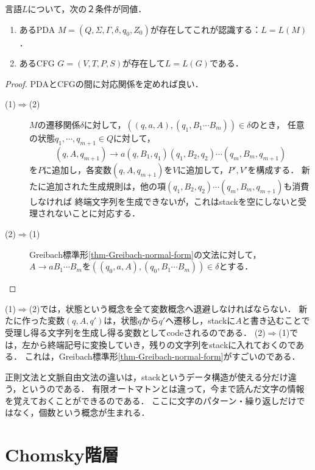 \documentclass[uplatex, dvipdfmx]{jsreport}
\begin{document}
\begin{theorem}\label{thm-CFL-PDA}
    言語$L$について，次の２条件が同値．
    \begin{enumerate}
        \item あるPDA $M=(Q,\Sigma,\Gamma,\delta,q_0,Z_0)$が存在してこれが認識する：$L=L(M)$．
        \item あるCFG $G=(V,T,P,S)$が存在して$L=L(G)$である．
    \end{enumerate}
\end{theorem}
\begin{proof}
    PDAとCFGの間に対応関係を定めれば良い．
    \begin{description}
        \item[(1)$\Rightarrow$(2)] 
        $M$の遷移関係$\delta$に対して，$((q,a,A),(q_1,B_1\cdots B_m))\in\delta$のとき，
        任意の状態$q_1,\cdots,q_{m+1}\in Q$に対して，
        \[(q,A,q_{m+1})\to a(q,B_1,q_1)(q_1,B_2,q_2)\cdots(q_m,B_m,q_{m+1})\]
        を$P$に追加し，各変数$(q,A,q_{m+1})$を$V$に追加して，$P',V'$を構成する．
        新たに追加された生成規則は，他の項$(q_1,B_2,q_2)\cdots(q_m,B_m,q_{m+1})$も消費しなければ
        終端文字列を生成できないが，これはstackを空にしないと受理されないことに対応する．
        \item[(2)$\Rightarrow$(1)] 
        Greibach標準形\ref{thm-Greibach-normal-form}の文法に対して，
        $A\to aB_1\cdots B_m$を$((q_0,a,A),(q_0,B_1\cdots B_m))\in\delta$とする．
    \end{description}
\end{proof}
\begin{remarks}[Greibach標準形が全て]
    (1)$\Rightarrow$(2)では，状態という概念を全て変数概念へ退避しなければならない．
    新たに作った変数$(q,A,q')$は，状態$q$から$q'$へ遷移し，stackに$A$と書き込むことで受理し得る文字列を生成し得る変数としてcodeされるのである．
    (2)$\Rightarrow$(1)では，左から終端記号に変換していき，残りの文字列をstackに入れておくのである．
    これは，Greibach標準形\ref{thm-Greibach-normal-form}がすごいのである．
\end{remarks}

\begin{screen}
    正則文法と文脈自由文法の違いは，stackというデータ構造が使える分だけ違う，というのである．
    有限オートマトンとは違って，今まで読んだ文字の情報を覚えておくことができるのである．
    ここに文字のパターン・繰り返しだけではなく，個数という概念が生まれる．
\end{screen}

\section{Chomsky階層}
\end{document}
